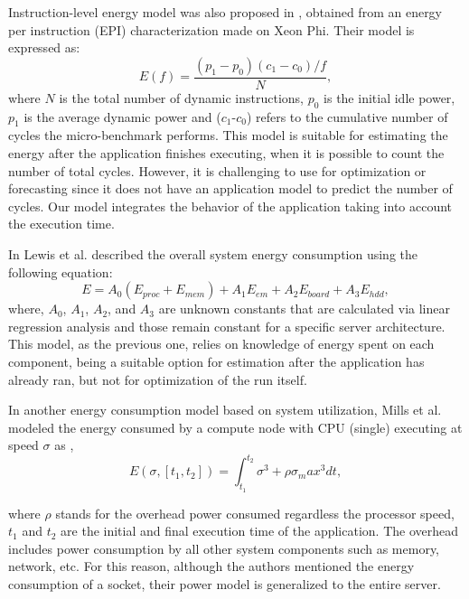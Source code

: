 Instruction-level energy model was also proposed in \cite{Characterization2013EnergyProcessor}, obtained from an energy per instruction (EPI) characterization made on Xeon Phi. Their model is expressed as:
\begin{equation}
E(f) = \frac{(p_1 - p_0)(c_1 - c_0)/f}{N}, 
\end{equation}
where $N$ is the total number of dynamic instructions, $p_0$ is the initial idle power, $p_1$ is the average dynamic power and ($c_1$-$c_0$) refers to the cumulative number of cycles the micro-benchmark performs. This model is suitable for estimating the energy after the application finishes executing, when it is possible to count the number of total cycles. However, it is challenging to use for optimization or forecasting since it does not have an application model to predict the number of cycles. Our model integrates the behavior of the application taking into account the execution time.

In \cite{Lewis2008Run-timeSystems} Lewis et al. described the overall system energy consumption using the following equation:
\begin{equation}
E = A_0(E_{proc} + E_{mem}) + A_1E_{em} + A_2E_{board} + A_3E_{hdd},    
\end{equation}
where, $A_0$, $A_1$, $A_2$, and $A_3$ are unknown constants that are calculated via linear regression analysis and those remain constant for a specific server architecture. This model, as the previous one, relies on knowledge of energy spent on each component, being  a suitable option for estimation after the application has already ran, but not for optimization of the run itself.

In another energy consumption model  based on system utilization, Mills et al. modeled the energy consumed by a compute node with CPU (single) executing at speed $\sigma$ as \cite{Mills2014EnergySystems},
\begin{equation}
E(\sigma,[t_1,t_2]) = \int_{t_1}^{t_2} \sigma^3 + \rho \sigma_max^3 dt,
\end{equation}

where $\rho$ stands for the overhead power  consumed regardless the processor speed, $t_1$ and $t_2$ are the initial and final execution time of the application. The overhead includes power consumption by all other system components such as memory, network, etc. For this reason, although the authors mentioned the energy consumption of a socket, their power model is generalized to the entire server.

